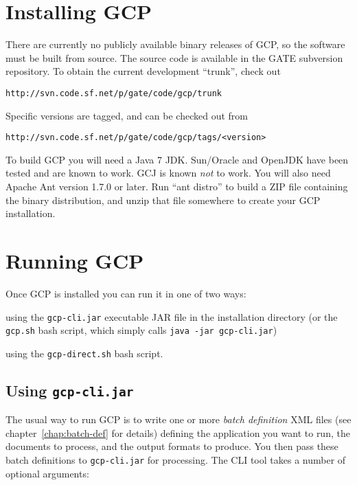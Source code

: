 \section{Installing GCP}

There are currently no publicly available binary releases of GCP, so the
software must be built from source.  The source code is available in the GATE
subversion repository.  To obtain the current development ``trunk'', check out
\begin{verbatim}
http://svn.code.sf.net/p/gate/code/gcp/trunk
\end{verbatim}
%
Specific versions are tagged, and can be checked out from
\begin{verbatim}
http://svn.code.sf.net/p/gate/code/gcp/tags/<version>
\end{verbatim}

To build GCP you will need a Java 7 JDK.  Sun/Oracle and OpenJDK have been
tested and are known to work.  GCJ is known {\em not} to work.  You will also
need Apache Ant version 1.7.0 or later.  Run ``ant distro'' to build a ZIP file
containing the binary distribution, and unzip that file somewhere to create
your GCP installation.

\section{Running GCP}

Once GCP is installed you can run it in one of two ways:
\bit
\item using the \verb!gcp-cli.jar! executable
JAR file in the installation directory (or the \verb!gcp.sh! bash script, which
simply calls \verb!java -jar gcp-cli.jar!)
\item using the \verb!gcp-direct.sh! bash script.
\eit

\subsection{Using {\tt gcp-cli.jar}}

The usual way to run GCP is to write one or more {\em batch definition} XML
files (see chapter~\ref{chap:batch-def} for details) defining the application
you want to run, the documents to process, and the output formats to produce.
You then pass these batch definitions to \verb!gcp-cli.jar! for processing.
The CLI tool takes a number of optional arguments:

